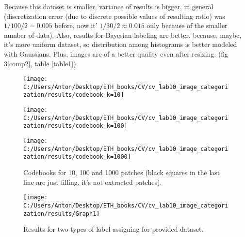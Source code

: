 \documentclass{report}
\begin{document}
	 Because this dataset is smaller, variance of results is bigger, in general (discretization error (due to discrete possible values of resulting ratio) was $1/100/2 = 0.005$ before, now it' $1/30/2 \approx 0.015$ only because of the smaller number of data). Also, results for Bayesian labeling are better, because, maybe, it's more uniform dataset, so distribution among histograms is better modeled with Gaussians. Plus, images are of a better quality even after resizing. (fig 3\ref{comp2}, table \ref{table1})
	

\begin{figure}[h]
	\begin{center}
		\label{codebook}
		\begin{minipage}[h]{0.3\linewidth}
			\texttt{[image: C:/Users/Anton/Desktop/ETH\_books/CV/cv\_lab10\_image\_categorization/results/codebook\_k=10]}
		\end{minipage}
		\hfill
		\begin{minipage}[h]{0.3\linewidth}
			\texttt{[image: C:/Users/Anton/Desktop/ETH\_books/CV/cv\_lab10\_image\_categorization/results/codebook\_k=100]}
		\end{minipage}
		\hfill
		\begin{minipage}[h]{0.3\linewidth}
			\texttt{[image: C:/Users/Anton/Desktop/ETH\_books/CV/cv\_lab10\_image\_categorization/results/codebook\_k=1000]}
		\end{minipage}
		\caption{Codebooks for 10, 100 and 1000 patches (black squares in the last line are just filling, it's not extracted patches).}
	\end{center}
\end{figure}

\begin{figure}[h!]
	
	\begin{center}
		
		\begin{minipage}[h]{0.95\linewidth}
			\texttt{[image: C:/Users/Anton/Desktop/ETH\_books/CV/cv\_lab10\_image\_categorization/results/Graph1]}
		\end{minipage}
		
		\caption{Results for two types of label assigning for provided dataset.}
	\end{center}
\label{comp}
\end{figure}

\centering
\end{document}
